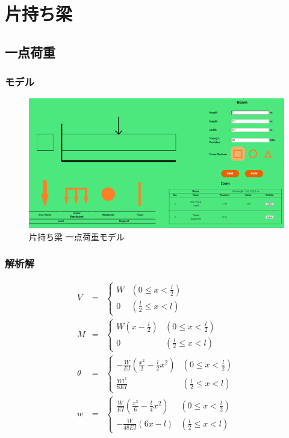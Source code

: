 \documentclass{jsarticle}
\begin{document}
\newpage
\section{片持ち梁}
\subsection{一点荷重}
\subsubsection{モデル}

\begin{figure}[H]
\begin{center}
\includegraphics[width=13cm]{cantilever_one_model.PNG}
\caption{片持ち梁 一点荷重モデル}
\end{center}
\end{figure}

\subsubsection{解析解}

\begin{eqnarray*}
V &=& \left\{ \begin{array}{ll}
    W & (0\leq x<\frac{l}{2}) \\
    0 & (\frac{l}{2}\leq x < l)
  \end{array} \right. \\
M &=& \left\{ \begin{array}{ll}
    W\left(x-\frac{l}{2}\right) & (0\leq x<\frac{l}{2}) \\
    0 & (\frac{l}{2}\leq x < l)
  \end{array} \right. \\
\theta &=& \left\{ \begin{array}{ll}
    -\frac{W}{EI}\left(\frac{x^2}{2}-\frac{l}{2}x^2\right) & (0\leq x<\frac{l}{2}) \\
    \frac{Wl^2}{8EI} & (\frac{l}{2}\leq x < l)
  \end{array} \right. \\
w &=& \left\{ \begin{array}{ll}
    \frac{W}{EI}\left(\frac{x^3}{6}-\frac{l}{4}x^2\right) & (0\leq x<\frac{l}{2}) \\
    -\frac{W}{48EI}\left(6x-l\right) & (\frac{l}{2}\leq x < l)
  \end{array} \right.
\end{eqnarray*}
\end{document}
